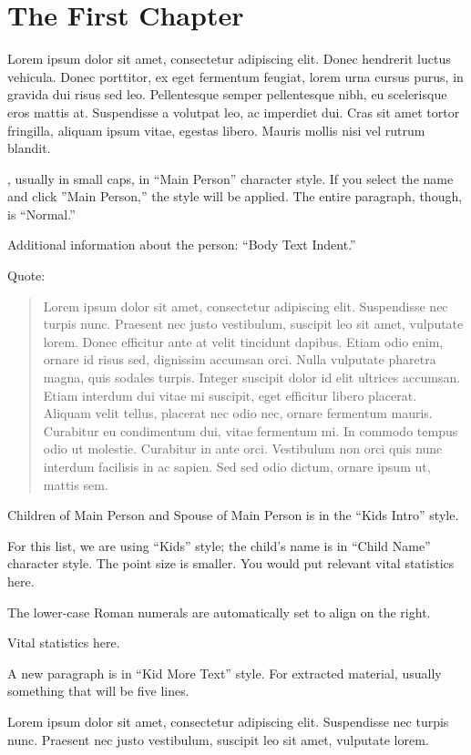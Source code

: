 \chapter{The First Chapter}

 Lorem ipsum dolor sit amet, consectetur adipiscing elit. Donec hendrerit luctus vehicula. Donec porttitor, ex eget fermentum feugiat, lorem urna\cite{lamport94} cursus purus, in gravida dui risus sed leo. Pellentesque semper pellentesque nibh, eu scelerisque eros mattis at. Suspendisse a volutpat leo, ac imperdiet dui. Cras sit amet tortor fringilla, aliquam ipsum vitae, egestas libero. Mauris mollis nisi vel rutrum blandit. 

, usually in small caps, in ``Main Person'' character style. If you select the name and click ''Main Person,'' the style will be applied. The entire paragraph, though, is ``Normal.''
	
Additional information about the person: ``Body Text Indent.''

Quote:

\begin{quote}
	Lorem ipsum dolor sit amet, consectetur adipiscing elit. Suspendisse nec turpis nunc. Praesent nec justo vestibulum, suscipit leo sit amet, vulputate lorem. Donec efficitur ante at velit tincidunt dapibus. Etiam odio enim, ornare id risus sed, dignissim accumsan orci. Nulla vulputate pharetra magna, quis sodales turpis. Integer suscipit dolor id elit ultrices accumsan. Etiam interdum dui vitae mi suscipit, eget efficitur libero placerat. Aliquam velit tellus, placerat nec odio nec, ornare fermentum mauris. Curabitur eu condimentum dui, vitae fermentum mi. In commodo tempus odio ut molestie. Curabitur in ante orci. Vestibulum non orci quis nunc interdum facilisis in ac sapien. Sed sed odio dictum, ornare ipsum ut, mattis sem. 
\end{quote}

\begin{KidsIntro}
	Children of Main Person and Spouse of Main Person is in the ``Kids Intro'' style.
\end{KidsIntro}

\begin{Kids}

	 For this list, we are using ``Kids'' style; the child's name is in ``Child Name'' character style. The point size is smaller. You would put relevant vital statistics here.
	
	 The lower-case Roman numerals are automatically set to align on the right.
	
	 Vital statistics here.
	
	\begin{KidsMoreText}A new paragraph is in ``Kid More Text'' style. For extracted material, usually something that will be five lines.\end{KidsMoreText}

\end{Kids}

\begin{Grandkids}	
	  Lorem ipsum dolor sit amet, consectetur adipiscing elit. Suspendisse nec turpis nunc. Praesent nec justo vestibulum, suscipit leo sit amet, vulputate lorem.
\end{Grandkids}


